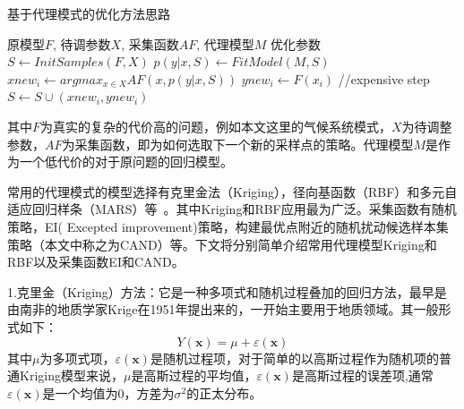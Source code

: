 \renewcommand{\algorithmicrequire}{\textbf{输入:}}
\renewcommand{\algorithmicensure}{\textbf{输出:}}
\begin{algorithm}
        \caption{基于代理模式的优化方法思路}
        \begin{algorithmic}[1] %
            \Require 原模型$F$, 待调参数$X$, 采集函数$AF$, 代理模型$M$
            \Ensure 优化参数
            \State $S \gets InitSamples( F, X )$
                \State $p( y| x, S ) \gets FitModel(M, S)$
                \State $xnew_i \gets argmax_{x\in X}AF(x,p(y|x,S))$
                \State $ynew_i \gets F(x_i)$  //expensive step
                \State $S \gets S \cup (xnew_i,ynew_i)$
            \EndFor
        \end{algorithmic}
\end{algorithm}

其中$F$为真实的复杂的代价高的问题，例如本文这里的气候系统模式，$X$为待调整参数，$AF$为采集函数，即为如何选取下一个新的采样点的策略。代理模型$M$是作为一个低代价的对于原问题的回归模型。

常用的代理模式的模型选择有克里金法（Kriging），径向基函数（RBF）和多元⾃适应回归样条（MARS）等~\cite{xu2018parameter}。其中Kriging和RBF应用最为广泛。采集函数有随机策略，EI( Excepted improvement)策略，构建最优点附近的随机扰动候选样本集策略（本文中称之为CAND）等。下文将分别简单介绍常用代理模型Kriging和RBF以及采集函数EI和CAND。

1.克里金（Kriging）方法：它是一种多项式和随机过程叠加的回归方法，最早是由南非的地质学家Krige在1951年提出来的，一开始主要用于地质领域。其一般形式如下：
\begin{equation}
\label{equ:Rasfuc}
Y ( \mathbf { x } ) = \mu + \varepsilon ( \mathbf { x } )
\end{equation}
其中$\mu$为多项式项，$\varepsilon ( \mathbf { x } )$是随机过程项，对于简单的以高斯过程作为随机项的普通Kriging模型来说，$\mu$是高斯过程的平均值，$\varepsilon ( \mathbf { x } )$是高斯过程的误差项,通常$\varepsilon ( \mathbf { x } )$是一个均值为0，方差为$\sigma ^ { 2 }$的正太分布。

